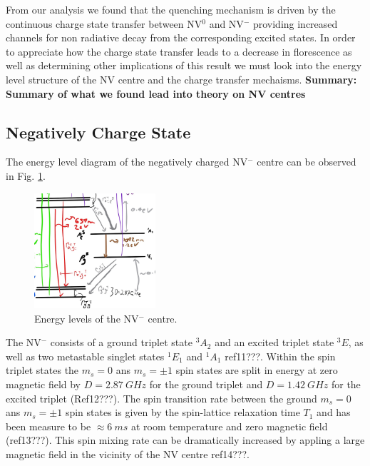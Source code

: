 \documentclass[,prl,twocolumn]{revtex4}
\begin{document}
From our analysis we found that the quenching mechanism is driven by the continuous charge state transfer between NV$^0$ and NV$^-$ providing increased channels for non radiative decay from the corresponding excited states. In order to appreciate how the charge state transfer leads to a decrease in florescence as well as determining other implications of this result we must look into the energy level structure of the NV centre and the charge transfer mechaisms.
\textbf{Summary: Summary of what we found lead into theory on NV centres}

\subsection{Negatively Charge State}
The energy level diagram of the negatively charged NV$^-$ centre  can be observed in Fig. \ref{FigEnergyLevelsNV-}.

\begin{figure}[H]
  \centering
  \includegraphics[width=0.4\textwidth]{NV-.jpg} 
 \caption{Energy levels of the NV$^-$ centre.} \label{FigEnergyLevelsNV-}
\end{figure}

The NV$^-$ consists of a ground triplet state $^3A_2$ and an excited triplet state $^3E$, as well as two metastable singlet states $^1E_1$ and $^1A_1$ ref11???. Within the spin triplet states the $m_s = 0$ ans $m_s = \pm1$ spin states are split in energy at zero magnetic field by $D=\SI{2.87}{GHz}$ for the ground triplet and $D=\SI{1.42}{GHz}$ for the excited triplet (Ref12???). The spin transition rate between the ground $m_s = 0$ ans $m_s = \pm1$ spin states is given by the spin-lattice relaxation time $T_1$ and has been measure to be $\approx\SI{6}{ms}$ at room temperature and zero magnetic field (ref13???). This spin mixing rate can be dramatically increased by appling a large magnetic field in the vicinity of the NV centre ref14???.
\end{document}
